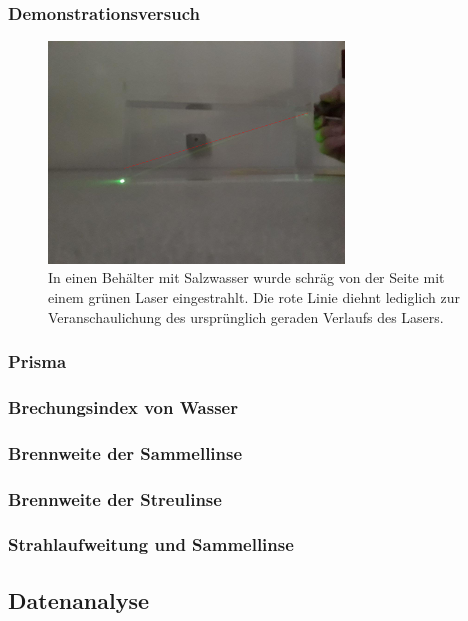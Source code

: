 \documentclass[
	a4paper,
	12pt,
	pagesize,
	ngerman
]{scrartcl}
\begin{document}
	\subsubsection{Demonstrationsversuch}
	\begin{figure}[H]
		\includegraphics[width=0.7\textwidth]{Salzwasser}
		\centering
		\caption{In einen Behälter mit Salzwasser wurde schräg von der Seite mit einem grünen Laser eingestrahlt. Die rote Linie diehnt lediglich zur Veranschaulichung des ursprünglich geraden Verlaufs des Lasers.} 
		\label{fig_salzwasser}
		\centering
	\end{figure}

	\subsubsection{Prisma} %
	\subsubsection{Brechungsindex von Wasser}
	\subsubsection{Brennweite der Sammellinse}
	\subsubsection{Brennweite der Streulinse}
	\subsubsection{Strahlaufweitung und Sammellinse}
	\subsection{Datenanalyse}
\end{document}

